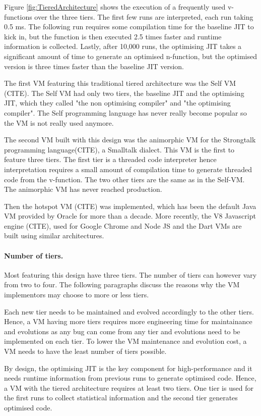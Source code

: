 \documentclass[a4paper,12pt,twoside]{../includes/ThesisStyle}
\begin{document}
Figure \ref{fig:TieredArchitecture} shows the execution of a frequently used v-functions over the three tiers. The first few runs are interpreted, each run taking 0.5 ms. The following run requires some compilation time for the baseline JIT to kick in, but the function is then executed 2.5 times faster and runtime information is collected. Lastly, after 10,000 runs, the optimising JIT takes a significant amount of time to generate an optimised n-function, but the optimised version is three times faster than the baseline JIT version.


The first VM featuring this traditional tiered architecture was the Self VM (CITE). The Self VM had only two tiers, the baseline JIT and the optimising JIT, which they called "the non optimising compiler" and "the optimising compiler". The Self programming language has never really become popular so the VM is not really used anymore. 

The second VM built with this design was the animorphic VM for the Strongtalk programming language(CITE), a Smalltalk dialect. This VM is the first to feature three tiers. The first tier is a threaded code interpreter hence interpretation requires a small amount of compilation time to generate threaded code from the v-function. The two other tiers are the same as in the Self-VM. The animorphic VM has never reached production.

Then the hotspot VM (CITE) was implemented, which has been the default Java VM provided by Oracle for more than a decade. More recently, the V8 Javascript engine (CITE), used for Google Chrome and Node JS and the Dart VMs are built using similar architectures.  

\paragraph{Number of tiers.} Most featuring this design have three tiers. The number of tiers can however vary from two to four. The following paragraphs discuss the reasons why the VM implementors may choose to more or less tiers.

Each new tier needs to be maintained and evolved accordingly to the other tiers. Hence, a VM having more tiers requires more engineering time for maintainance and evolutions as any bug can come from any tier and evolutions need to be implemented on each tier. To lower the VM maintenance and evolution cost, a VM needs to have the least number of tiers possible.

By design, the optimising JIT is the key component for high-performance and it needs runtime information from previous runs to generate optimised code. Hence, a VM with the tiered architecture requires at least two tiers. One tier is used for the first runs to collect statistical information and the second tier generates optimised code. 
\end{document}
